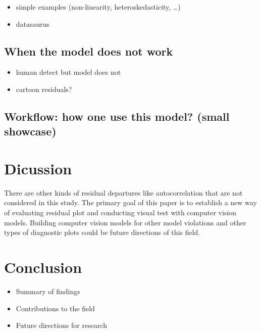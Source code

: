 \documentclass[]{interact}
\theoremstyle{plain}%
\theoremstyle{definition}
\theoremstyle{remark}
\providecommand{\tightlist}{%
  \setlength{\itemsep}{0pt}\setlength{\parskip}{0pt}}
\def\tightlist{}
\begin{document}
\begin{itemize}
\tightlist
\item
  simple examples (non-linearity, heteroskedasticity, \ldots)
\item
  datasaurus
\end{itemize}

\hypertarget{when-the-model-does-not-work}{%
\subsection{When the model does not
work}\label{when-the-model-does-not-work}}

\begin{itemize}
\tightlist
\item
  human detect but model does not
\item
  cartoon residuals?
\end{itemize}

\hypertarget{workflow-how-one-use-this-model-small-showcase}{%
\subsection{Workflow: how one use this model? (small
showcase)}\label{workflow-how-one-use-this-model-small-showcase}}

\hypertarget{dicussion}{%
\section{Dicussion}\label{dicussion}}

There are other kinds of residual departures like autocorrelation that
are not considered in this study. The primary goal of this paper is to
establish a new way of evaluating residual plot and conducting visual
test with computer vision models. Building computer vision models for
other model violations and other types of diagnostic plots could be
future directions of this field.

\hypertarget{conclusion}{%
\section{Conclusion}\label{conclusion}}

\begin{itemize}
\tightlist
\item
  Summary of findings
\item
  Contributions to the field
\item
  Future directions for research
\end{itemize}



\end{document}
